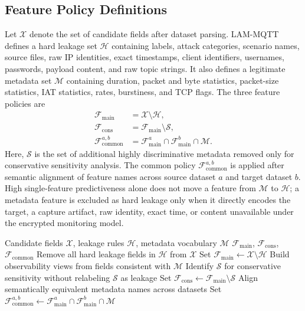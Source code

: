 \documentclass[lettersize,journal]{IEEEtran}
\begin{document}
\subsection{Feature Policy Definitions}
Let $\mathcal{X}$ denote the set of candidate fields after dataset parsing. LAM-MQTT defines a hard leakage set $\mathcal{H}$ containing labels, attack categories, scenario names, source files, raw IP identities, exact timestamps, client identifiers, usernames, passwords, payload content, and raw topic strings. It also defines a legitimate metadata set $\mathcal{M}$ containing duration, packet and byte statistics, packet-size statistics, IAT statistics, rates, burstiness, and TCP flags. The three feature policies are
\begin{align}
\mathcal{F}_{\mathrm{main}} &= \mathcal{X} \setminus \mathcal{H},\\
\mathcal{F}_{\mathrm{cons}} &= \mathcal{F}_{\mathrm{main}} \setminus \mathcal{S},\\
\mathcal{F}_{\mathrm{common}}^{a,b} &= \mathcal{F}_{\mathrm{main}}^{a} \cap \mathcal{F}_{\mathrm{main}}^{b} \cap \mathcal{M}.
\end{align}
Here, $\mathcal{S}$ is the set of additional highly discriminative metadata removed only for conservative sensitivity analysis. The common policy $\mathcal{F}_{\mathrm{common}}^{a,b}$ is applied after semantic alignment of feature names across source dataset $a$ and target dataset $b$. High single-feature predictiveness alone does not move a feature from $\mathcal{M}$ to $\mathcal{H}$; a metadata feature is excluded as hard leakage only when it directly encodes the target, a capture artifact, raw identity, exact time, or content unavailable under the encrypted monitoring model.

\begin{algorithm}[!t]
\caption{LAM-MQTT feature policy construction}
\label{alg:lammqtt}
\begin{algorithmic}[1]
\Require Candidate fields $\mathcal{X}$, leakage rules $\mathcal{H}$, metadata vocabulary $\mathcal{M}$
\Ensure $\mathcal{F}_{\mathrm{main}}$, $\mathcal{F}_{\mathrm{cons}}$, $\mathcal{F}_{\mathrm{common}}$
\State Remove all hard leakage fields in $\mathcal{H}$ from $\mathcal{X}$
\State Set $\mathcal{F}_{\mathrm{main}} \gets \mathcal{X} \setminus \mathcal{H}$
\State Build observability views from fields consistent with $\mathcal{M}$
\State Identify $\mathcal{S}$ for conservative sensitivity without relabeling $\mathcal{S}$ as leakage
\State Set $\mathcal{F}_{\mathrm{cons}} \gets \mathcal{F}_{\mathrm{main}} \setminus \mathcal{S}$
\State Align semantically equivalent metadata names across datasets
\State Set $\mathcal{F}_{\mathrm{common}}^{a,b} \gets \mathcal{F}_{\mathrm{main}}^{a} \cap \mathcal{F}_{\mathrm{main}}^{b} \cap \mathcal{M}$
\end{algorithmic}
\end{algorithm}
\end{document}
